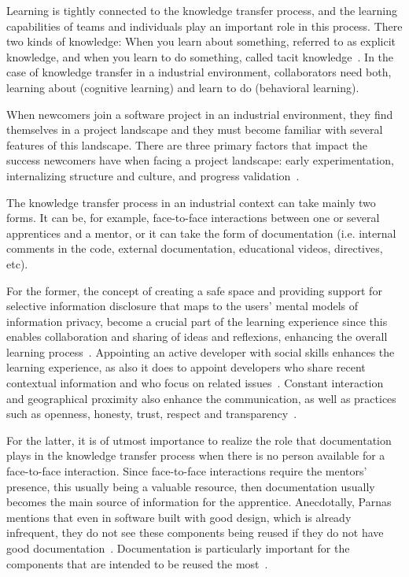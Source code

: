 \documentclass[12pt, letterpaper]{article}
\begin{document}
Learning is tightly connected to the knowledge transfer
process, and the learning capabilities of teams and individuals play an important role in 
this process.
There two kinds of knowledge: When you learn about something, referred to as explicit 
knowledge, and when you learn to do something, called tacit knowledge~\cite{cook99}. 
In the case of knowledge transfer in a industrial environment, collaborators need both, 
learning about (cognitive learning) and learn to do (behavioral learning).

When newcomers join a software project in an industrial environment, they find themselves in a project
landscape and they must become familiar with several features of this landscape.
There are three primary factors that impact the 
success newcomers have when facing a project landscape: early experimentation, internalizing structure
and culture, and progress validation~\cite{Dagenais10}.

The knowledge transfer process in an industrial context can take mainly two forms. It can be, for example,
face-to-face interactions between one or several apprentices and a mentor, or it can take the form of documentation 
(i.e. internal comments in the code, external documentation, educational videos, directives, etc). 

For the 
former, the concept of creating a safe space and providing support for selective information disclosure that
maps to the users' mental models of information privacy, become a crucial part of the learning
experience since this enables collaboration and sharing of ideas and reflexions, enhancing
the overall learning process~\cite{Razavi06}. Appointing an active developer with social skills
enhances the learning experience, as also it does to appoint developers who share recent
contextual information and who focus on related issues~\cite{Steinmacher12}. Constant interaction
and geographical proximity also enhance the communication, as well as practices such as 
openness, honesty, trust, respect and transparency~\cite{Whitworth06}. 

For the latter,
it is of utmost importance to realize the role that documentation plays in the knowledge transfer
process when there is no person available for a face-to-face interaction. Since face-to-face interactions
require the mentors' presence, this usually being a valuable resource, then documentation usually
becomes the main source of information for the apprentice. Anecdotally, Parnas mentions that even
in software built with good design, which is already infrequent, they do not see these components being
reused if they do not have good documentation~\cite{brooks95}. Documentation is particularly important 
for the components that are intended to be reused the most~\cite{monperrus11}.
\end{document}
